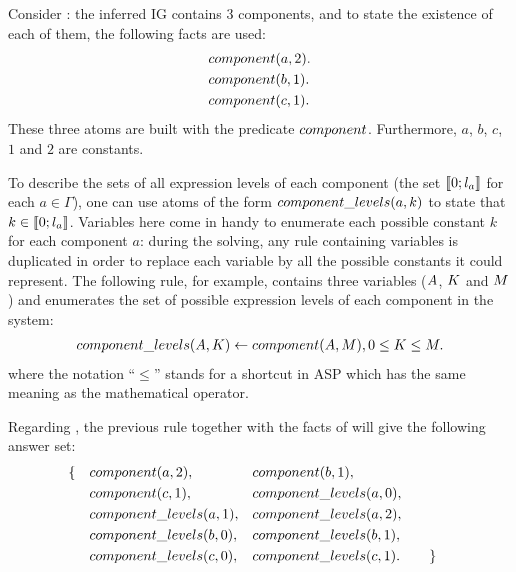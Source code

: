 \begin{example}\label{ex:asp-component}
Consider : the inferred IG contains 3 components, and to state the existence of each of them, the following facts are used:
\begin{align*}
  &component(a, 2). \\
  &component(b, 1). \\
  &component(c, 1).
\end{align*}
These three atoms are built with the predicate $component$.
Furthermore, $a$, $b$, $c$, $1$ and $2$ are constants.
\end{example}

To describe the sets of all expression levels of each component (\ie the set $\llbracket 0 ; l_a \rrbracket$ for each $a \in \Gamma$),
one can use atoms of the form $component\_levels(a, k)$ to state that $k \in \llbracket 0 ; l_a \rrbracket$.
Variables here come in handy to enumerate each possible constant $k$ for each component $a$:
during the solving, any rule containing variables is duplicated in order to replace each variable by all the possible constants it could represent.
The following rule, for example, contains three variables ($A$, $K$ and $M$) and enumerates the set of possible expression levels of each component in the system:
\begin{align*}
  component\_levels(A, K) \leftarrow component(A, M), 0 \leq K \leq M.
\end{align*}
where the notation “$\leq$” stands for a shortcut in ASP which has the same meaning as the mathematical operator.

\begin{example}
Regarding , the previous rule together with the facts of 
will give the following answer set:
\begin{align*}
  &\{&&component(a, 2),
  &&component(b, 1), \\
  &&&component(c, 1),
  &&component\_levels(a, 0), \\
  &&&component\_levels(a, 1),
  &&component\_levels(a, 2), \\
  &&&component\_levels(b, 0),
  &&component\_levels(b, 1), \\
  &&&component\_levels(c, 0),
  &&component\_levels(c, 1). &&&&\}
\end{align*}
\end{example}



